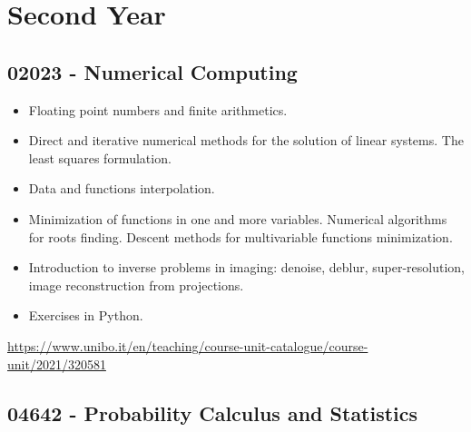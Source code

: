 \documentclass{article}
\begin{document}
\section{Second Year}

\subsection{02023 - Numerical Computing}

\begin{itemize}
    \item Floating point numbers and finite arithmetics.

    \item Direct and iterative numerical methods for the solution of linear systems. The least squares formulation.

    \item Data and functions interpolation.

    \item Minimization of functions in one and more variables. Numerical algorithms for roots finding. Descent methods for multivariable functions minimization.

    \item Introduction to inverse problems in imaging: denoise, deblur, super-resolution, image reconstruction from projections.

    \item Exercises in Python.
\end{itemize}

\url{https://www.unibo.it/en/teaching/course-unit-catalogue/course-unit/2021/320581}

\subsection{04642 - Probability Calculus and Statistics}
\end{document}
